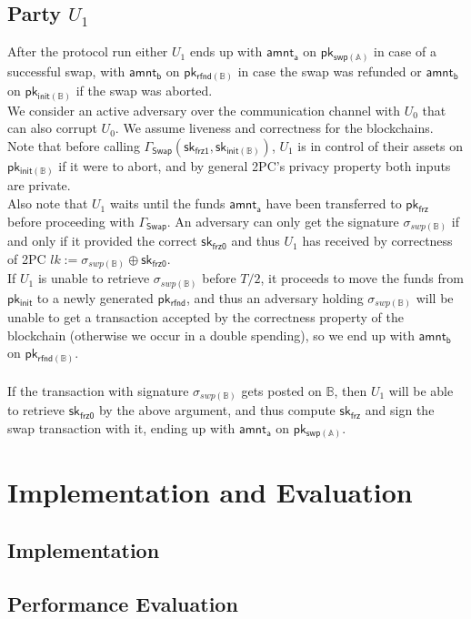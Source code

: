 \documentclass{article}      	%
\begin{document}
\subsection{Party $U_1$}
After the protocol run either $U_1$ ends up with $\mathsf{amnt_a}$ on $\mathsf{pk_{swp(\mathbb{A})}}$ in case of a successful swap, with $\mathsf{amnt_b}$ on $\mathsf{pk_{rfnd(\mathbb{B})}}$ in case the swap was refunded or $\mathsf{amnt_b}$ on $\mathsf{pk_{init(\mathbb{B})}}$ if the swap was aborted. \\
We consider an active adversary over the communication channel with $U_0$ that can also corrupt $U_0$. We assume liveness and correctness for the blockchains.\\

Note that before calling $\Gamma_{\mathsf{Swap}}(\mathsf{sk_{frz1}}, \mathsf{sk_{init(\mathbb{B})}})$, $U_1$ is in control of their assets on $\mathsf{pk_{init(\mathbb{B})}}$ if it were to abort, and by general 2PC's privacy property both inputs are private. \\
Also note that $U_1$ waits until the funds $\mathsf{amnt_a}$ have been transferred to $\mathsf{pk_{frz}}$ before proceeding with  $\Gamma_{\mathsf{Swap}}$.
An adversary can only get the signature $\sigma_{swp(\mathbb{B})}$ if and only if it provided the correct $\mathsf{sk_{frz0}}$ and thus $U_1$ has received by correctness of 2PC $lk := \sigma_{swp(\mathbb{B})} \oplus \mathsf{sk_{frz0}}$. \\
If $U_1$ is unable to retrieve $\sigma_{swp(\mathbb{B})}$ before $T/2$, it proceeds to move the funds from $\mathsf{pk_{init}}$ to a newly generated $\mathsf{pk_{rfnd}}$, and thus an adversary holding $\sigma_{swp(\mathbb{B})}$ will be unable to get a transaction accepted by the correctness property of the blockchain (otherwise we occur in a double spending), so we end up with  $\mathsf{amnt_b}$ on $\mathsf{pk_{rfnd(\mathbb{B})}}$. \\
\\
If the transaction with signature $\sigma_{swp(\mathbb{B})}$ gets posted on $\mathbb{B}$, then $U_1$ will be able to retrieve $\mathsf{sk_{frz0}}$ by the above argument, and thus compute $\mathsf{sk_{frz}}$ and sign the swap transaction with it, ending up with $\mathsf{amnt_a}$ on $\mathsf{pk_{swp(\mathbb{A})}}$.


\section{Implementation and Evaluation}

\subsection{Implementation}


\subsection{Performance Evaluation}


\printbibliography
\end{document}
